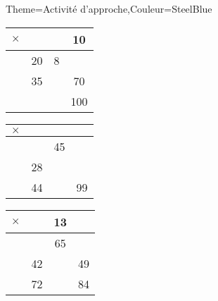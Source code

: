 \begin{Maquette}[Cours]{Theme={Activité d'approche},Couleur={SteelBlue}}
\begin{AActivite}
{      \bigskip
       \medskip
         \hskip10mm
         \begin{tabular}{|C{0.5}||C{0.5}|C{0.5}|C{0.5}|}
            \hline
            {\Large $\times$} & & & 10 \\
            \hline\hline
            & 20 & 8 & \\
            \hline
            & 35 & & 70 \\
            \hline
            & & & 100 \\
            \hline
         \end{tabular}
         \hskip16mm
         \begin{tabular}{|C{0.5}||C{0.5}|C{0.5}|C{0.5}|}
            \hline
            {\Large $\times$} & & & \\
            \hline\hline
            & & 45 & \\
            \hline
            & 28 & & \\
            \hline
            & 44 & & 99 \\
            \hline
         \end{tabular}
         \hskip16mm
         \begin{tabular}{|C{0.5}||C{0.5}|C{0.5}|C{0.5}|}
            \hline
            {\Large $\times$} & & 13 & \\
            \hline\hline
            & & 65 & \\
            \hline
            & 42 & & 49 \\
            \hline
            & 72 & & 84 \\
            \hline
         \end{tabular}}

      \end{AActivite}

\end{Maquette}


